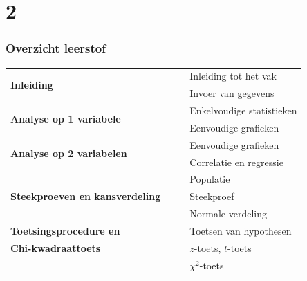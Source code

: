 \documentclass{beamer}
\newcommand{\tabitem}{~~\llap{\textbullet}~~}
\begin{document}
\section{2}

\begin{frame}
  \frametitle{Overzicht leerstof}

\begin{table}[h]
\begin{tabular}{l|l}
  \multirow{2}{*}{\textbf{Inleiding}} &
     \tabitem Inleiding tot het vak \\
   & \tabitem Invoer van gegevens \\

  \hline
  \multirow{2}{*}{\textbf{Analyse op 1 variabele}} &
      \tabitem Enkelvoudige statistieken \\
    & \tabitem Eenvoudige grafieken\\

  \hline
  \multirow{2}{*}{\textbf{Analyse op 2 variabelen}} &
      \tabitem Eenvoudige grafieken \\
    & \tabitem Correlatie en regressie\\

  \hline
  \multirow{3}{*}{\textbf{Steekproeven en kansverdeling}} &
      \tabitem Populatie\\
    & \tabitem Steekproef\\
    & \tabitem Normale verdeling\\

  \hline
  \textbf{Toetsingsprocedure en} & \tabitem Toetsen van hypothesen \\
  \textbf{Chi-kwadraattoets}     & \tabitem $z$-toets, $t$-toets\\
                                 & \tabitem $\chi^{2}$-toets\\

\end{tabular}
\end{table}
\end{frame}
\end{document}
